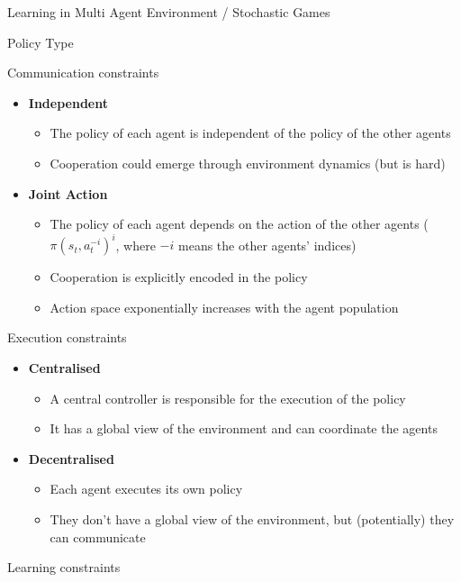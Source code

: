 \documentclass[presentation, 8pt]{beamer}\mode<presentation>{\usetheme{AMSBolognaFC}}
\begin{document}
\begin{frame}[allowframebreaks]{Learning in Multi Agent Environment / Stochastic Games}
\begin{exampleblock}{Policy Type}
\begin{itemize}
\begin{itemize}
	\end{itemize}
\end{itemize}
\end{exampleblock}
\begin{exampleblock}{Communication constraints}
\begin{itemize}
	\item \textbf{Independent}
	\begin{itemize}
		\item The policy of each agent is independent of the policy of the other agents
		\item Cooperation could emerge through environment dynamics (but is hard)
	\end{itemize}
	\item \textbf{Joint Action}
	\begin{itemize}
		\item The policy of each agent depends on the action of the other agents ($ \pi(s_t, a^{-i}_t)^i $, where $-i$ means the other agents' indices)
		\item Cooperation is explicitly encoded in the policy
		\item Action space exponentially increases with the agent population
	\end{itemize}
\end{itemize}
\end{exampleblock}
\begin{exampleblock}{Execution constraints}
\begin{itemize}
	\item \textbf{Centralised}
	\begin{itemize}
		\item A central controller is responsible for the execution of the policy
		\item It has a global view of the environment and can coordinate the agents
	\end{itemize}
	\item \textbf{Decentralised}
	\begin{itemize}
		\item Each agent executes its own policy
		\item They don't have a global view of the environment, but (potentially) they can communicate
	\end{itemize}
\end{itemize}
\end{exampleblock}
\begin{exampleblock}{Learning constraints}
\begin{itemize}

\end{itemize}
\end{exampleblock}
\end{frame}
\end{document}
